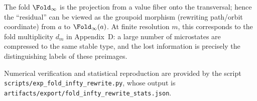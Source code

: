 \begin{remark}\label{rem:residual}
The fold $\Fold_\infty$ is the projection from a value fiber onto the transversal; hence the ``residual'' can be viewed as the groupoid morphism (rewriting path/orbit coordinate) from $a$ to $\Fold_\infty(a)$. At finite resolution $m$, this corresponds to the fold multiplicity $d_m$ in Appendix~D: a large number of microstates are compressed to the same stable type, and the lost information is precisely the distinguishing labels of these preimages.
\end{remark}

Numerical verification and statistical reproduction are provided by the script \texttt{scripts/exp\_fold\_infty\_rewrite.py}, whose output is
\texttt{artifacts/export/fold\_infty\_rewrite\_stats.json}.
